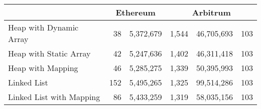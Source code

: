 \begin{table*}[t]
\begin{tabular} {|l|r|r|r|r|r|}
\multicolumn{1}{|c|}{} &                                                            \multicolumn{2}{c|}{\textbf{Ethereum}}&                                                                                                            \multicolumn{3}{c|}{\textbf{Arbitrum}} 														\\ \hline
Heap with Dynamic Array      				& 38            		& 5,372,679                   	   						& 1,544					& 46,705,693					& 103								\\ \hline
Heap with Static Array       					& 42            		& 5,247,636                  	        					& 1,402					& 46,311,418					& 103									 \\ \hline
Heap with Mapping 						& 46           	 	& 5,285,275                     	           					& 1,339					& 50,395,993					& 103									\\ \hline
Linked List                     					& 152            		& 5,495,265                     	             					& 1,325					& 99,514,286					& 103									\\ \hline
Linked List with Mapping     				& 86             		& 5,433,259                     	              					& 1,319					& 58,035,156					& 103									\\ \hline


\end{tabular}
\end{table*}
